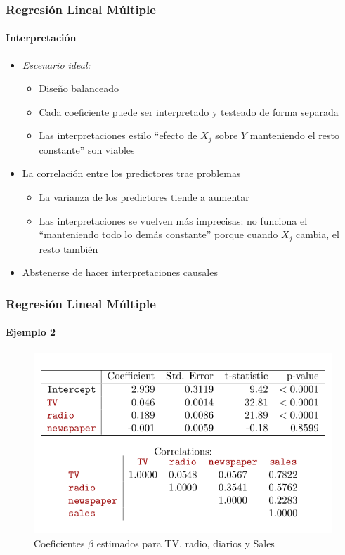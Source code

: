 \documentclass{beamer}
\begin{document}
\begin{frame}
\frametitle{Regresión Lineal Múltiple}
\framesubtitle{Interpretación}
\begin{itemize}
	\item{\emph{Escenario ideal:}}
	\begin{itemize}
		\item{Diseño balanceado}
		\item{Cada coeficiente puede ser interpretado y testeado de forma separada}
		\item{Las interpretaciones estilo ``efecto de $X_{j}$ sobre $Y$ manteniendo el resto constante'' son viables}
	\end{itemize}
	\item{La correlación entre los predictores trae problemas}
	\begin{itemize}
		\item{La varianza de los predictores tiende a aumentar}
		\item{Las interpretaciones se vuelven más imprecisas: no funciona el ``manteniendo todo lo demás constante'' porque cuando $X_{j}$ cambia, el resto también}	
	\end{itemize}
	\item{Abstenerse de hacer interpretaciones causales}
\end{itemize}
\end{frame}


\begin{frame}
\frametitle{Regresión Lineal Múltiple}
\framesubtitle{Ejemplo 2}
\begin{figure}[h]
	\includegraphics[width=0.8\linewidth, height=0.6\textheight]{./img/table02}
	\caption{Coeficientes $\beta$ estimados para TV, radio, diarios y Sales \cite{hastie02}}
\end{figure}
\end{frame}
\end{document}
